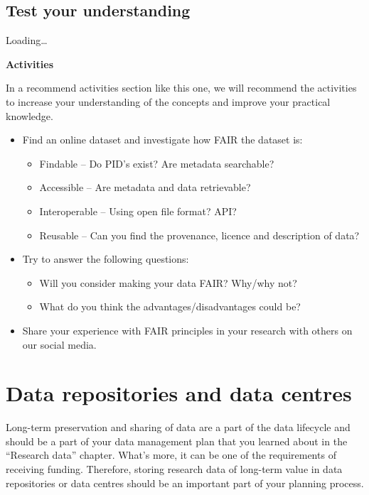 \documentclass[
]{book}
\begin{document}
\hypertarget{test-your-understanding-4}{%
\section{Test your understanding}\label{test-your-understanding-4}}

Loading\ldots{}

\textbf{Activities}

In a recommend activities section like this one, we will recommend the activities to increase your understanding of the concepts and improve your practical knowledge.

\begin{itemize}
\item
  Find an online dataset and investigate how FAIR the dataset is:

  \begin{itemize}
  \item
    Findable -- Do PID's exist? Are metadata searchable?
  \item
    Accessible -- Are metadata and data retrievable?
  \item
    Interoperable -- Using open file format? API?
  \item
    Reusable -- Can you find the provenance, licence and description of data?
  \end{itemize}
\item
  Try to answer the following questions:

  \begin{itemize}
  \item
    Will you consider making your data FAIR? Why/why not?
  \item
    What do you think the advantages/disadvantages could be?
  \end{itemize}
\item
  Share your experience with FAIR principles in your research with others on our social media.
\end{itemize}

\hypertarget{data-repositories-and-data-centres}{%
\chapter{Data repositories and data centres}\label{data-repositories-and-data-centres}}

Long-term preservation and sharing of data are a part of the data lifecycle and should be a part of your data management plan that you learned about in the ``Research data'' chapter. What's more, it can be one of the requirements of receiving funding. Therefore, storing research data of long-term value in data repositories or data centres should be an important part of your planning process.
\end{document}
